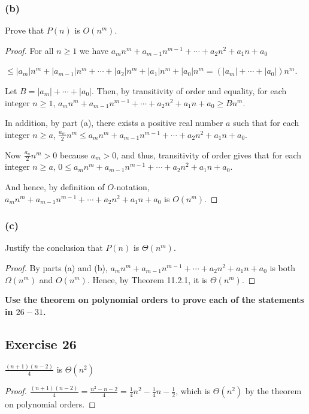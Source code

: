 \documentclass[14pt]{extarticle}
\newcommand{\dps}{\displaystyle}
\newcommand{\cy}{\color{cyan}}
\begin{document}
\subsubsection{(b)}
Prove that \(P(n)\) is \(O(n^m)\).
\begin{proof}
    For all \(n \geq 1\) we have \(a_mn^m + a_{m-1}n^{m-1} + \cdots + a_2n^2 + a_1n + a_0\)

    \(\leq |a_m|n^m + |a_{m-1}|n^m + \cdots + |a_2|n^m + |a_1|n^m + |a_0|n^m = (|a_m| + \cdots + |a_0|)n^m\).

    Let \(B = |a_m| + \cdots + |a_0|\). Then, by transitivity of order and equality, for each integer \(n \geq 1\), \(a_mn^m +
    a_{m-1}n^{m-1} + \cdots + a_2n^2 + a_1n + a_0 \geq Bn^m\).

    In addition, by part (a), there exists a positive real number \(a\) such that for each integer \(n \geq a\), \(\frac{a_m}{2}
    n^m \leq a_mn^m + a_{m-1}n^{m-1} + \cdots + a_2n^2 + a_1n + a_0\).

    Now \(\frac{a_n}{2} n^m > 0\) because \(a_m > 0\), and thus, transitivity of order gives that for each integer \(n\geq a\),
    \(0 \leq a_mn^m + a_{m-1}n^{m-1} + \cdots + a_2n^2 + a_1n + a_0\).

    And hence, by definition of \(O\)-notation, \(a_mn^m + a_{m-1}n^{m-1} + \cdots + a_2n^2 + a_1n + a_0\) is \(O(n^m)\).
\end{proof}

\subsubsection{(c)}
Justify the conclusion that \(P(n)\) is \(\Theta(n^m)\).
\begin{proof}
    By parts (a) and (b), \(a_mn^m + a_{m-1}n^{m-1} + \cdots + a_2n^2 + a_1n + a_0\) is both \(\Omega(n^m)\) and \(O(n^m)\).
    Hence, by Theorem 11.2.1, it is \(\Theta(n^m)\).
\end{proof}

{\bf \cy Use the theorem on polynomial orders to prove each of the statements in \(26-31\).}

\subsection{Exercise 26}
\(\dps \frac{(n+1)(n-2)}{4}\) is \(\Theta(n^2)\)

\begin{proof}
    \(\dps \frac{(n+1)(n-2)}{4} = \frac{n^2-n-2}{4} = \frac{1}{4}n^2 - \frac{1}{4}n - \frac{1}{2}\), which is \(\Theta(n^2)\)
    by the theorem on polynomial orders.
\end{proof}
\end{document}
